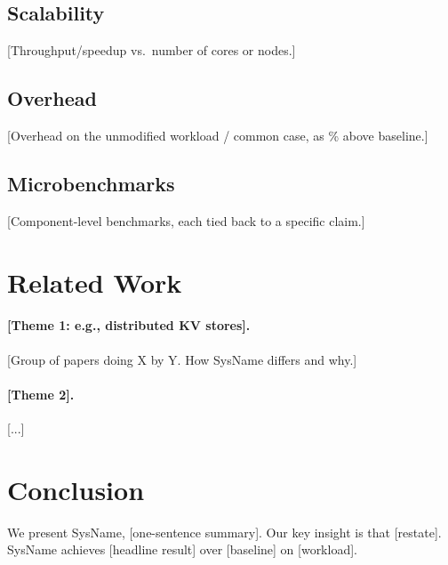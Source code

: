 \documentclass[sigplan,10pt]{acmart}
\newcommand{\sysname}{SysName\xspace}   %
\begin{document}
\subsection{Scalability}
[Throughput/speedup vs.\ number of cores or nodes.]

\subsection{Overhead}
[Overhead on the unmodified workload / common case, as \% above baseline.]

\subsection{Microbenchmarks}
[Component-level benchmarks, each tied back to a specific claim.]


\section{Related Work}
\label{sec:related}

\paragraph{[Theme 1: e.g., distributed KV stores].}
[Group of papers doing X by Y. How \sysname differs and why.]

\paragraph{[Theme 2].} [...]


\section{Conclusion}
\label{sec:conclusion}

We present \sysname, [one-sentence summary]. Our key insight is that [restate].
\sysname achieves [headline result] over [baseline] on [workload].





\end{document}
